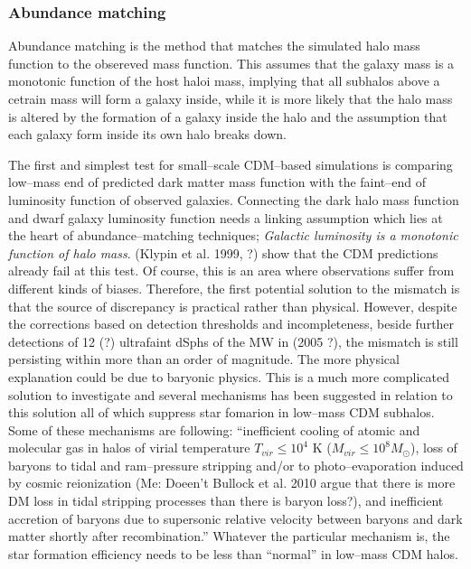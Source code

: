 \documentclass[paper=a4, fontsize=11pt]{scrartcl} %
\numberwithin{equation}{section} %
\numberwithin{figure}{section} %
\numberwithin{table}{section} %
\begin{document}
\subsubsection{Abundance matching}
Abundance matching is the method that matches the simulated halo mass function to the obsereved mass function. This assumes that the galaxy mass is a monotonic function of the host haloi mass, implying that all subhalos above a cetrain mass will form a galaxy inside, while it is more likely that the halo mass is altered by the formation of a galaxy inside the halo and the assumption that each galaxy form inside its own halo breaks down. 

The first and simplest test for small--scale CDM--based simulations is comparing low--mass end of predicted dark matter mass function with the faint--end of luminosity function of observed galaxies. Connecting the dark halo mass function and dwarf galaxy luminosity function needs a linking assumption which lies at the heart of abundance--matching techniques; \emph{Galactic luminosity is a monotonic function of halo mass}. (Klypin et al. 1999, ?) show that the CDM predictions already fail at this test. Of course, this is an area where observations suffer from different kinds of biases. Therefore, the first potential solution to the mismatch is that the source of discrepancy is practical rather than physical. However, despite the corrections based on detection thresholds and incompleteness, beside further detections of 12 (?) ultrafaint dSphs of the MW in (2005 ?), the mismatch is still persisting within more than an order of magnitude. The more physical explanation could be due to baryonic physics. This is a much more complicated solution to investigate and several mechanisms has been suggested in relation to this solution all of which suppress star fomarion in low--mass CDM subhalos. Some of these mechanisms are following: ``inefficient cooling of atomic and molecular gas in halos of virial temperature $T_{vir} \leq 10^4$ K ($M_{vir} \leq 10^8 M_\odot$), loss of baryons to tidal and ram--pressure stripping and/or to photo--evaporation induced by cosmic reionization (Me: Doeen't Bullock et al. 2010 argue that there is more DM loss in tidal stripping processes than there is baryon loss?), and inefficient accretion of baryons due to supersonic relative velocity between baryons and dark matter shortly after recombination.'' Whatever the particular mechanism is, the star formation efficiency needs to be less than ``normal'' in low--mass CDM halos.
\end{document}
